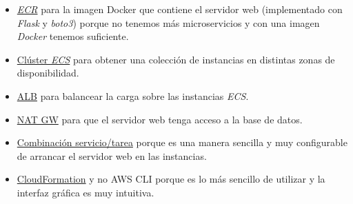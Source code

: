 \begin{itemize}
    \item \underline{\textit{ECR}} para la imagen Docker que contiene el servidor web (implementado con \textit{Flask} y \textit{boto3}) porque no tenemos más microservicios y con una imagen \textit{Docker} tenemos suficiente.

    \item \underline{Clúster \textit{ECS}} para obtener una colección de instancias en distintas zonas de disponibilidad.

    \item \underline{ALB} para balancear la carga sobre las instancias \textit{ECS}.

    \item \underline{NAT GW} para que el servidor web tenga acceso a la base de datos.

    \item \underline{Combinación servicio/tarea} porque es una manera sencilla y muy configurable de arrancar el servidor web en las instancias.

    \item \underline{CloudFormation} y no AWS CLI porque es lo más sencillo de utilizar y la interfaz gráfica es muy intuitiva.
\end{itemize}
